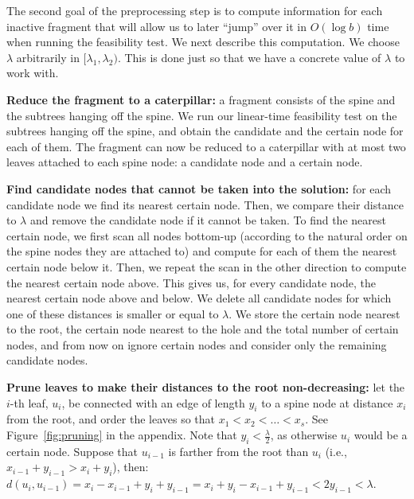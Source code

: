 \documentclass[a4paper,UKenglish]{lipics-v2016}
\newcounter{mycounter}
\newenvironment{noindlist}
 {\begin{list}{\arabic{mycounter}.~~}{\usecounter{mycounter} \labelsep=0em \labelwidth=0em \leftmargin=0em \itemindent=0em}}
 {\end{list}}
\theoremstyle{plain}
\begin{document}
The second goal of the preprocessing step is to
compute information for each inactive fragment that will allow us to later ``jump'' over it in $O(\log b)$ time when running the feasibility test.  We next describe this computation.  We choose $\lambda$ arbitrarily in
$[\lambda_1,\lambda_2)$. This is done just so that we have a concrete value of $\lambda$ to work with.
\begin{noindlist}
\item\textbf{Reduce the fragment to a caterpillar:}
a fragment consists of the spine and the subtrees hanging off the spine. %
We run our linear-time feasibility test on the subtrees hanging off the spine, and obtain
the candidate and the certain node for each of them. The fragment can now be reduced to a caterpillar with at most two leaves attached to each
spine node: a candidate node and a certain node.
\item\label{removing certain nodes}
\textbf{Find candidate nodes that cannot be taken into the solution:}
for each candidate node we find its nearest certain node. Then, we compare their distance to $\lambda$ and remove the
candidate node if it cannot be taken. To find the nearest certain node, we first scan all nodes bottom-up (according to the natural order
on the spine nodes they are attached to) and compute for each of them the nearest certain node below it. Then, we repeat the scan
in the other direction to compute the nearest certain node above. This gives us, for every candidate node, the nearest certain node above
and below. We delete all candidate nodes for which one of these distances is smaller or equal to $\lambda$.
We store the certain node nearest to the root, the certain node nearest to the hole and the total number of certain nodes,
and from now on ignore certain nodes and consider only the remaining candidate nodes.
\item\label{making distances from the root monotone}
\textbf{Prune leaves to make their distances to the root non-decreasing:}
let the $i$-th leaf, $u_{i}$, be connected with an edge of length $y_{i}$ to a spine node at distance $x_{i}$ from the root,
and order the leaves so that $x_{1}<x_{2}<\ldots<x_{s}$. See Figure~\ref{fig:pruning} in the appendix.
Note that $y_{i}<\frac{\lambda}{2}$, as otherwise $u_{i}$ would be a certain node.
Suppose that $u_{i-1}$ is farther from the root than $u_i$ (i.e.,
$x_{i-1}+y_{i-1} > x_i+y_i$), then:
$d(u_{i},u_{i-1}) = x_i-x_{i-1}+y_i+y_{i-1} = x_{i} + y_{i} - x_{i-1} + y_{i-1} < 2y_{i-1} < \lambda.$

\end{noindlist}
\end{document}
